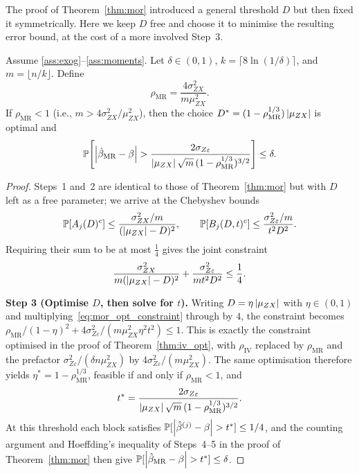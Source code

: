 The proof of Theorem~\ref{thm:mor} introduced a general threshold $D$ but then
fixed it symmetrically. Here we keep $D$ free and choose it to minimise the
resulting error bound, at the cost of a more involved Step~3.

\begin{theorem}
\label{thm:mor_opt}
    Assume \ref{ass:exog}--\ref{ass:moments}. Let $\delta \in (0,1)$, $k = \lceil 8\ln(1/\delta) \rceil$, and $m = \lfloor n/k \rfloor$. Define
    \[
        \rho_{\mathrm{MR}} = \frac{4\sigma_{ZX}^2}{m\mu_{ZX}^2}.
    \]
    If $\rho_{\mathrm{MR}} < 1$ (i.e., $m > 4\sigma_{ZX}^2/\mu_{ZX}^2$),
    then the choice $D^* = (1-\rho_{\mathrm{MR}}^{1/3})\left|\mu_{ZX}\right|$ is optimal and
    \begin{equation}
    \label{eq:mor_bound_opt}
        \operatorname{\mathbb{P}}\!\left[\left|\hat{\beta}_{\mathrm{MR}} - \beta\right| > \frac{2\sigma_{Z\varepsilon}}{\left|\mu_{ZX}\right|\sqrt{m}\,(1-\rho_{\mathrm{MR}}^{1/3})^{3/2}} \right] \leq \delta.
    \end{equation}
\end{theorem}

\begin{proof}
    Steps~1 and~2 are identical to those of Theorem~\ref{thm:mor} but with $D$ left as a free parameter; we arrive at the Chebyshev bounds
    \[
        \operatorname{\mathbb{P}}[A_j(D)^c] \leq \frac{\sigma_{ZX}^2/m}{(\left|\mu_{ZX}\right|-D)^2}, \qquad \operatorname{\mathbb{P}}[B_j(D,t)^c] \leq \frac{\sigma_{Z\varepsilon}^2/m}{t^2 D^2}.
    \]
    Requiring their sum to be at most $\frac{1}{4}$ gives the joint constraint
    \begin{equation}
    \label{eq:mor_opt_constraint}
        \frac{\sigma_{ZX}^2}{m(\left|\mu_{ZX}\right|-D)^2} + \frac{\sigma_{Z\varepsilon}^2}{m t^2 D^2} \leq \frac{1}{4}.
    \end{equation}

    \medskip\noindent\textbf{Step 3 (Optimise $D$, then solve for $t$).}
    Writing $D = \eta\left|\mu_{ZX}\right|$ with $\eta\in(0,1)$ and multiplying~\eqref{eq:mor_opt_constraint} through by $4$, the constraint becomes $\rho_{\mathrm{MR}}/(1-\eta)^2 + 4\sigma_{Z\varepsilon}^2/(m\mu_{ZX}^2\eta^2 t^2) \leq 1$. This is exactly the constraint optimised in the proof of Theorem~\ref{thm:iv_opt}, with $\rho_{\mathrm{IV}}$ replaced by $\rho_{\mathrm{MR}}$ and the prefactor $\sigma_{Z\varepsilon}^2/(\delta n\mu_{ZX}^2)$ by $4\sigma_{Z\varepsilon}^2/(m\mu_{ZX}^2)$. The same optimisation therefore yields $\eta^* = 1 - \rho_{\mathrm{MR}}^{1/3}$, feasible if and only if $\rho_{\mathrm{MR}} < 1$, and
    \[
        t^* = \frac{2\sigma_{Z\varepsilon}}{\left|\mu_{ZX}\right|\sqrt{m}\,(1-\rho_{\mathrm{MR}}^{1/3})^{3/2}}.
    \]
    At this threshold each block satisfies $\operatorname{\mathbb{P}}[\left|\hat{\beta}^{(j)}-\beta\right| > t^*] \leq 1/4$, and the counting argument and Hoeffding's inequality of Steps~4--5 in the proof of Theorem~\ref{thm:mor} then give $\Prob[\abs{\hat\beta_{\mathrm{MR}}-\beta}>t^*]\leq\delta$.
\end{proof}

